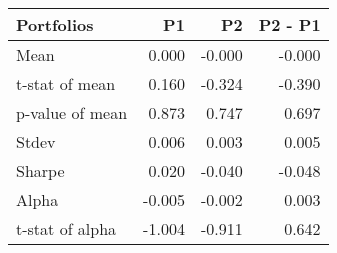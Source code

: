 \begin{tabular}{lrrr}
\toprule
Portfolios & P1 & P2 & P2 - P1 \\
\midrule
Mean & 0.000 & -0.000 & -0.000 \\
t-stat of mean & 0.160 & -0.324 & -0.390 \\
p-value of mean & 0.873 & 0.747 & 0.697 \\
Stdev & 0.006 & 0.003 & 0.005 \\
Sharpe & 0.020 & -0.040 & -0.048 \\
Alpha & -0.005 & -0.002 & 0.003 \\
t-stat of alpha & -1.004 & -0.911 & 0.642 \\
\bottomrule
\end{tabular}
